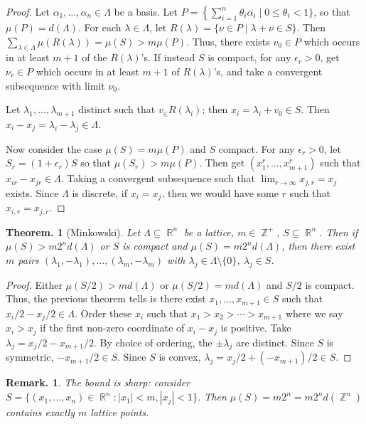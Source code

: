 \documentclass[11pt, a4paper]{memoir}
\DeclareMathOperator{\Z}{{\mathbb{Z}}}
\DeclareMathOperator{\R}{{\mathbb{R}}}
\theoremstyle{change}
\newtheorem{theorem}{Theorem.}[section]
\theoremstyle{plain}
\theoremstyle{nonumberplain}
\newtheorem{remark}{Remark.}
\newtheorem{proof}{Proof}
\numberwithin{equation}{section}
\begin{document}
\begin{proof}
    Let $\alpha_1,\ldots,\alpha_n\in\Lambda$ be a basis.
    Let $P=\left\{\sum_{i=1}^n\theta_i\alpha_i\mid 0\leq\theta_i<1\}$, so that $\mu(P)=d(\Lambda)$.
    For each $\lambda\in\Lambda$, let $R(\lambda)=\{\nu\in P\mid\lambda+\nu\in S\}$.
    Then $\sum_{\lambda\in\Lambda}\mu(R(\lambda))=\mu(S)>m\mu(P)$.
    Thus, there exists $v_0\in P$ which occurs in at least $m+1$ of the $R(\lambda)$'s.
    If instead $S$ is compact, for any $\epsilon_r>0$, get $\nu_r\in P$ which occurs in at least $m+1$ of $R(\lambda)$'s, and take a convergent subsequence with limit $\nu_0$.

    Let $\lambda_1,\ldots,\lambda_{m+1}$ distinct such that $v_\in R(\lambda_i)$; then $x_i=\lambda_i+v_0\in S$.
    Then $x_i-x_j=\lambda_i-\lambda_j\in\Lambda$.

    Now consider the case $\mu(S)=m\mu(P)$ and $S$ compact.
    For any $\epsilon_r>0$, let $S_r=(1+\epsilon_r)S$ so that $\mu(S_r)>m\mu(P)$.
    Then get $(x_1^r,\ldots,x_{m+1}^r)$ such that $x_{ir}-x_{jr}\in\Lambda$.
    Taking a convergent subsequence such that $\lim_{r\to\infty}x_{j,r}=x_j$ exists.
    Since $\Lambda$ is discrete, if $x_i=x_j$, then we would have some $r$ such that $x_{i,r}=x_{j,r}$.
\end{proof}
\begin{theorem}[Minkowski]
    Let $\Lambda\subseteq\R^n$ be a lattice, $m\in\Z^+$, $S\subseteq\R^n$.
    Then if $\mu(S)>m2^nd(\Lambda)$ or $S$ is compact and $\mu(S)=m2^nd(\Lambda)$, then there exist $m$ pairs $(\lambda_1,-\lambda_1),\ldots,(\lambda_m,-\lambda_m)$ with $\lambda_j\in\Lambda\setminus\{0\}$, $\lambda_j\in S$.
\end{theorem}
\begin{proof}
    Either $\mu(S/2)>md(\Lambda)$ or $\mu(S/2)=md(\Lambda)$ and $S/2$ is compact.
    Thus, the previous theorem tells is there exist $x_1,\ldots,x_{m+1}\in S$ such that $x_i/2-x_j/2\in\Lambda$.
    Order these $x_i$ such that $x_1>x_2>\cdots>x_{m+1}$ where we say $x_i>x_j$ if the first non-zero coordinate of $x_i-x_j$ is positive.
    Take $\lambda_j=x_j/2-x_{m+1}/2$.
    By choice of ordering, the $\pm\lambda_j$ are distinct.
    Since $S$ is symmetric, $-x_{m+1}/2\in S$.
    Since $S$ is convex, $\lambda_j=x_j/2+(-x_{m+1})/2\in S$.
\end{proof}
\begin{remark}
    The bound is sharp: consider $S=\{(x_1,\ldots,x_n)\in\R^n:|x_1|<m,|x_j|<1\}$.
    Then $\mu(S)=m2^n=m2^nd(\Z^n)$ contains exactly $m$ lattice points.
\end{remark}
\end{document}
